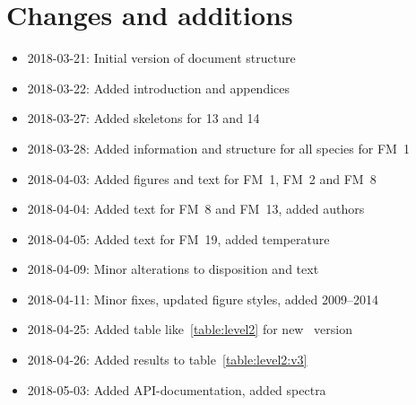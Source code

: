 \chapter{Changes and additions}
\label{ch:changes}

\begin{itemize}
    \item 2018-03-21: Initial version of document structure
    \item 2018-03-22: Added introduction and appendices
    \item 2018-03-27: Added skeletons for 13 and 14
    \item 2018-03-28: Added information and structure for all species for FM~1
    \item 2018-04-03: Added figures and text for FM~1, FM~2 and FM~8
    \item 2018-04-04: Added text for FM~8 and FM~13, added authors
    \item 2018-04-05: Added text for FM~19, added temperature
    \item 2018-04-09: Minor alterations to disposition and text
    \item 2018-04-11: Minor fixes, updated figure styles, added 2009--2014
    \item 2018-04-25: Added table like~\ref{table:level2} for new \smr~version
    \item 2018-04-26: Added results to table~\ref{table:level2:v3}
    \item 2018-05-03: Added API-documentation, added spectra
\end{itemize}
